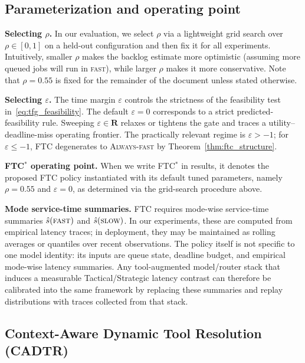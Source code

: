 \documentclass[fleqn,12pt,lineno]{wlpeerj}
\begin{document}
\subsection{Parameterization and operating point}
\label{sec:tfg_params}

\noindent\textbf{Selecting $\rho$.}
In our evaluation, we select $\rho$ via a lightweight grid search over $\rho\in[0,1]$ on a held-out configuration and then fix it for all experiments. Intuitively, smaller $\rho$ makes the backlog estimate more optimistic (assuming more queued jobs will run in \textsc{fast}), while larger $\rho$ makes it more conservative. Note that $\rho=0.55$ is fixed for the remainder of the document unless stated otherwise.

\noindent\textbf{Selecting $\varepsilon$.}
The time margin $\varepsilon$ controls the strictness of the feasibility test in~\eqref{eq:tfg_feasibility}. The default $\varepsilon=0$ corresponds to a strict predicted-feasibility rule. Sweeping $\varepsilon\in \mathbf{R}$ relaxes or tightens the gate and traces a utility--deadline-miss operating frontier. The practically relevant regime is $\varepsilon>-1$; for $\varepsilon\le -1$, FTC degenerates to \textsc{Always-fast} by Theorem~\ref{thm:ftc_structure}.

\noindent\textbf{FTC$^{\ast}$ operating point.}
When we write FTC$^{\ast}$ in results, it denotes the proposed FTC policy instantiated with its default tuned parameters, namely $\rho=0.55$ and $\varepsilon=0$, as determined via the grid-search procedure above.

\noindent\textbf{Mode service-time summaries.}
FTC requires mode-wise service-time summaries $\hat{s}(\textsc{fast})$ and $\hat{s}(\textsc{slow})$. In our experiments, these are computed from empirical latency traces; in deployment, they may be maintained as rolling averages or quantiles over recent observations. The policy itself is not specific to one model identity: its inputs are queue state, deadline budget, and empirical mode-wise latency summaries. Any tool-augmented model/router stack that induces a measurable Tactical/Strategic latency contrast can therefore be calibrated into the same framework by replacing these summaries and replay distributions with traces collected from that stack.

\subsection{Context-Aware Dynamic Tool Resolution (CADTR)}
\label{sec:cadtr}
\end{document}
